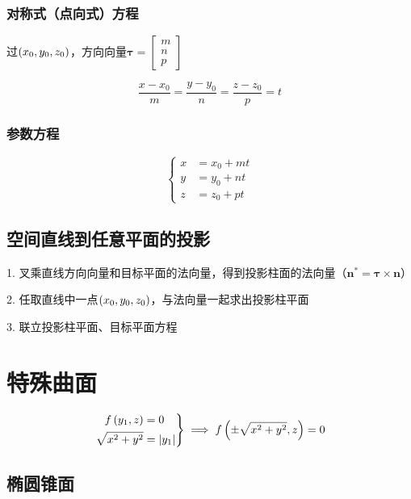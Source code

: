 \documentclass{article}
\begin{document}
\subsubsection{对称式（点向式）方程}

过$\left(x_0,y_0,z_0\right)$，方向向量$\boldsymbol\tau=\begin{bmatrix}m\\n\\p\end{bmatrix}$

\[\frac{x-x_0}m=\frac{y-y_0}n=\frac{z-z_0}p=t\]

\subsubsection{参数方程}

\[\left\{\begin{aligned}
        x & =x_0+mt \\
        y & =y_0+nt \\
        z & =z_0+pt
    \end{aligned}\right.\]

\subsection{空间直线到任意平面的投影}

1. 叉乘直线方向向量和目标平面的法向量，得到投影柱面的法向量（$\boldsymbol n^*=\boldsymbol\tau\times\boldsymbol n$）

2. 任取直线中一点$\left(x_0,y_0,z_0\right)$，与法向量一起求出投影柱平面

3. 联立投影柱平面、目标平面方程

\section{特殊曲面}

\begin{definition}[绕$z$轴旋转曲面：（原曲线为$f\p{y_1,z}=0$）]
    \[\left.\begin{aligned}
            f\left(y_1,z\right)     & =0         \\
            \sqrt{x^2+y^2} & =\left|y_1\right|
        \end{aligned}\right\}
        \implies
        f\left(\pm\sqrt{x^2+y^2},z\right)=0\]
\end{definition}

\subsection{椭圆锥面}
\end{document}

